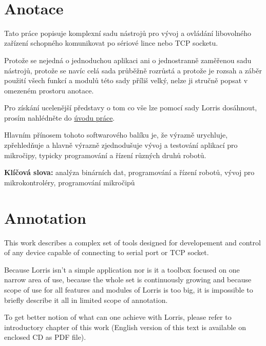 \documentclass[12pt, a4paper, oneside]{article}
\newcommand{\D}{\medskip \noindent} %
\newcommand{\B}{\textbf} %
\begin{document}
\newpage   %
~ %
\vspace{-20mm}

\section*{Anotace}

Tato práce popisuje komplexní sadu nástrojů pro vývoj a ovládání libovolného zařízení schopného komunikovat po sériové lince nebo TCP socketu.

Protože se nejedná o jednoduchou aplikaci ani o jednostranně zaměřenou sadu nástrojů, protože se navíc celá sada průběžně rozrůstá a protože je rozsah a záběr použití všech funkcí a modulů této sady příliš velký, nelze ji stručně popsat v omezeném prostoru anotace.

Pro získání ucelenější představy o tom co vše lze pomocí sady Lorris dosáhnout, prosím nahlédněte do \hyperref[uvod]{úvodu práce}.


Hlavním přínosem tohoto softwarového balíku je, že výrazně urychluje, zpřehledňuje a hlavně výrazně zjednodušuje vývoj a testování aplikací pro mikročipy, typicky programování a řízení různých druhů robotů.

\D \B{Klíčová slova:} analýza binárních dat, programování a řízení robotů, vývoj pro mikrokontroléry, programování mikročipů

\section*{Annotation}

This work describes a complex set of tools designed for developement and control of any device capable of connecting to serial port or TCP socket.

Because Lorris isn't a simple application nor is it a toolbox focused on one narrow area of use, because the whole set is continuously growing and because scope of use for all features and modules of Lorris is too big, it is impossible to briefly describe it all in limited scope of annotation.

To get better notion of what can one achieve with Lorris, please refer to introductory chapter of this work (English version of this text is available on enclosed CD as PDF file).
\end{document}
